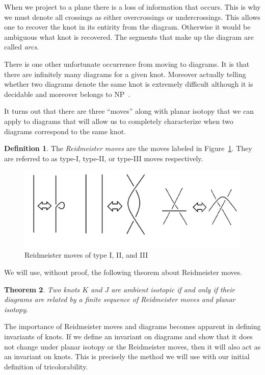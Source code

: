 \documentclass[12pt]{amsart}
\newtheorem{theorem}{Theorem}[section]
\theoremstyle{definition}
\newtheorem{definition}[theorem]{Definition}
\theoremstyle{remark}
\numberwithin{equation}{section}
\newcommand{\ds}{.3}
\begin{document}
When we project to a plane there is a loss of information that occurs. This
is why we must denote all crossings as either overcrossings or undercrossings.
This allows one to recover the knot in its entirity from the diagram. Otherwise
it would be ambiguous what knot is recovered. The segments that make up the diagram
are called \textit{arcs}.

There is one other unfortunate occurrence
from moving to diagrams. It is that there are infinitely many diagrams
for a given knot. Moreover actually telling whether two diagrams denote
the same knot is extremely difficult although it is decidable and moreover
belongs to NP~\cite{Poonen}.

It turns out that there are three ``moves'' along with planar isotopy
that we can apply to diagrams that will allow us to completely characterize
when two diagrams correspond to the same knot.

\begin{definition}
  The \textit{Reidmeister moves} are the moves labeled in Figure~\ref{fig:reidmeister}.
  They are referred to as type-I, type-II, or type-III moves respectively.

  \begin{figure}
    \includegraphics[scale=\ds]{reidmeister}
    \caption{Reidmeister moves of type I, II, and III}
    \label{fig:reidmeister}
  \end{figure}
\end{definition}

We will use, without proof, the following theorem about Reidmeister moves.

\begin{theorem}
  Two knots $K$ and $J$ are ambient isotopic if and only if their diagrams
  are related by a finite sequence of Reidmeister moves and planar isotopy.
\end{theorem}

The importance of Reidmeister moves and diagrams becomes apparent
in defining invariants of knots. If we define an invariant on diagrams and show
that it does not change under planar isotopy or the Reidmeister moves, then
it will also act as an invariant on knots. This is precisely the method we
will use with our initial definition of tricolorability.
\end{document}
